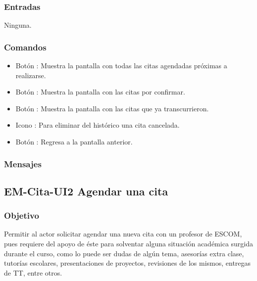 \subsubsection{Entradas}
	\noindent
	Ninguna.

\subsubsection{Comandos}
	\begin{itemize}
		\item Botón : Muestra la pantalla con todas las citas agendadas próximas a realizarse.
		\item Botón : Muestra la pantalla con las citas por confirmar.
		\item Botón : Muestra la pantalla con las citas que ya transcurrieron.
		\item Icono : Para eliminar del histórico una cita cancelada.
		\item Botón : Regresa a la pantalla anterior.
	\end{itemize}

\subsubsection{Mensajes}
	\begin{Citemize}
		\item {}
	\end{Citemize}


\pagebreak
\subsection{EM-Cita-UI2 Agendar una cita}

\subsubsection{Objetivo}
	\noindent
	Permitir al actor solicitar agendar una nueva cita con un profesor de ESCOM, pues requiere del apoyo de éste para solventar alguna situación académica surgida durante el curso, como lo puede ser dudas de algún tema, asesorías extra clase, tutorías escolares, presentaciones de proyectos, revisiones de los mismos, entregas de TT, entre otros.

